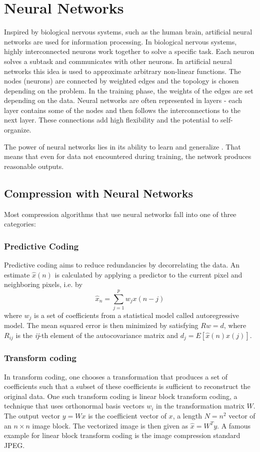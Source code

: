 \section{Neural Networks}
\label{sec:nn}

Inspired by biological nervous systems, such as the human brain, artificial neural networks are used for information processing. In biological nervous systems, highly interconnected neurons work together to solve a specific task\cite{ArtNNKapil}. Each neuron solves a subtask and communicates with other neurons. In artificial neural networks this idea is used to approximate arbitrary  non-linear functions. The nodes (neurons) are connected by weighted edges and the topology is chosen depending on the problem. In the training phase, the weights of the edges are set depending on the data. Neural networks are often represented in layers - each layer contains some of the nodes and then follows the interconnections to the next layer. These connections add high flexibility and the potential to self-organize.

The power of neural networks lies in its ability to learn and generalize \cite{Haykin:1998:NNC:521706}. That means that even for data not encountered during training, the network produces reasonable outputs. 

\subsection{Compression with Neural Networks}
Most compression algorithms that use neural networks fall into one of three categories\cite{Dony1995}: 

\subsubsection{Predictive Coding}
Predictive coding aims to reduce redundancies by decorrelating the data. An estimate \(\hat{x}(n)\) is calculated by applying a predictor to the current pixel and neighboring pixels, i.e. by
\begin{equation}
\hat{x}_n = \sum_{j=1}^{p} w_j x(n-j)
\end{equation}
where \({w_j}\) is a set of coefficients from a statistical model called autoregressive model. The mean squared error is then minimized by satisfying \(Rw = d\), where \(R_{ij}\) is the \emph{ij}-th element of the autocovariance matrix and \(d_j = E[\hat{x}(n)x(j)]\).

\subsubsection{Transform coding}
In transform coding, one chooses a transformation that produces a set of coefficients such that a subset of these coefficients is sufficient to reconstruct the original data. One such transform coding is linear block transform coding, a technique that uses orthonormal basis vectors \(w_i\) in the transformation matrix \(W\). The output vector \(y = Wx\) is the coefficient vector of \(x\), a length \(N = n^2\) vector of an \(n \times n\) image block. The vectorized image is then given as \(\hat{x} = W^Ty\). 
A famous example for linear block transform coding is the image compression standard JPEG.

